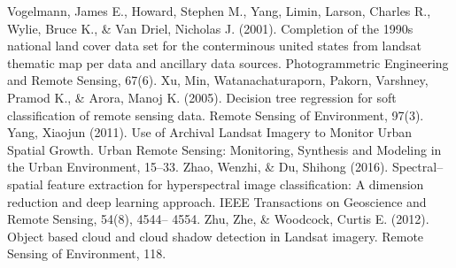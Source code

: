 \documentclass[letterpaper, 10 pt, conference]{ieeeconf}  %
\begin{document}
\begin{thebibliography}{99}
Vogelmann, James E., Howard, Stephen M., Yang, Limin, Larson, Charles R., Wylie, Bruce K., \& Van Driel, Nicholas J. (2001). Completion of the 1990s national land cover data set for the conterminous united states from landsat thematic map per data and ancillary data sources. Photogrammetric Engineering and Remote Sensing, 67(6).
Xu, Min, Watanachaturaporn, Pakorn, Varshney, Pramod K., \& Arora, Manoj K. (2005). Decision tree regression for soft classification of remote sensing data. Remote Sensing of Environment, 97(3).
Yang, Xiaojun (2011). Use of Archival Landsat Imagery to Monitor Urban Spatial Growth. Urban Remote Sensing: Monitoring, Synthesis and Modeling in the Urban Environment, 15–33.
Zhao, Wenzhi, \& Du, Shihong (2016). Spectral–spatial feature extraction for hyperspectral image classification: A dimension reduction and deep learning approach. IEEE Transactions on Geoscience and Remote Sensing, 54(8), 4544– 4554.
Zhu, Zhe, \& Woodcock, Curtis E. (2012). Object based cloud and cloud shadow detection in Landsat imagery. Remote Sensing of Environment, 118.






\end{thebibliography}
\end{document}
